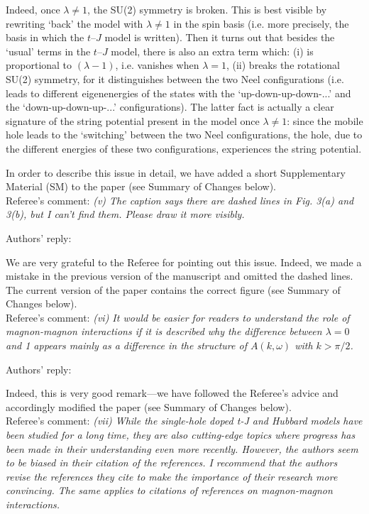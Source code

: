 \documentclass[%
 manuscript,
 amsmath,amssymb,
 aps, onecolumn,
prl,
]{revtex4-1}
\begin{document}
Indeed, once $\lambda \neq 1$, the SU(2) symmetry is broken. This is best visible by rewriting `back' the model with $\lambda \neq 1$ in the spin basis (i.e. more precisely, the basis in which the $t$--$J$ model is written). Then it turns out that besides the `usual' terms in the $t$--$J$ model, there is also an extra term which: (i) is proportional to $(\lambda -1)$, i.e. vanishes when $\lambda =1$, (ii) breaks the rotational SU(2) symmetry, for it distinguishes between the two Neel configurations (i.e. leads to different eigenenergies of the states with the `up-down-up-down-...' and the `down-up-down-up-...' configurations). The latter fact is actually a clear signature of the string potential present in the model once $\lambda \neq 1$: since the mobile hole leads to the `switching' between the two Neel configurations, the hole, due to the different energies of these two configurations, experiences the string potential.

In order to describe this issue in detail, we have added a short Supplementary Material (SM) to the paper (see Summary of Changes below).
\\

Referee's comment: {\it \color{blue}(v) The caption says there are dashed lines in Fig. 3(a) and 3(b), but
I can't find them. Please draw it more visibly.}

Authors' reply:

We are very grateful to the Referee for pointing out this issue. Indeed, we made a mistake in the previous version of the manuscript and omitted the dashed lines. The current version of the paper contains the correct figure (see Summary of Changes below).
\\

Referee's comment: {\it \color{blue}(vi) It would be easier for readers to understand the role of
magnon-magnon interactions if it is described why the difference
between $\lambda=0$ and 1 appears mainly as a difference in the
structure of $A(k,\omega)$ with $k>\pi/2$. }

Authors' reply:

Indeed, this is very good remark---we have followed the Referee's advice and accordingly modified the paper (see Summary of Changes below).
\\

Referee's comment: {\it \color{blue}(vii) While the single-hole doped t-J and Hubbard models have been
studied for a long time, they are also cutting-edge topics where
progress has been made in their understanding even more recently.
However, the authors seem to be biased in their citation of the
references. I recommend that the authors revise the references they
cite to make the importance of their research more convincing. The
same applies to citations of references on magnon-magnon interactions.}
\end{document}
